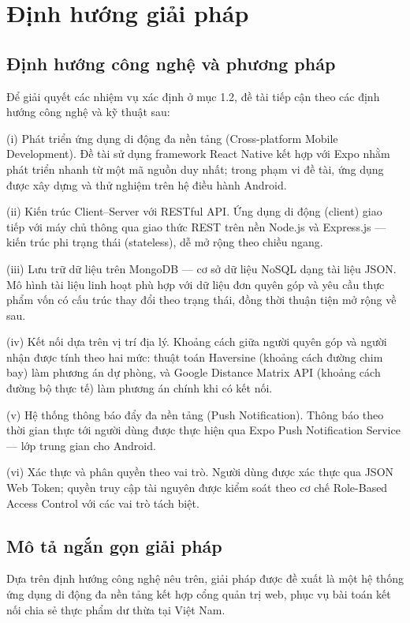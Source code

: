 \documentclass[../main.tex]{subfiles}%
\begin{document}
\section{Định hướng giải pháp}%
\label{section:1.3}

\subsection{Định hướng công nghệ và phương pháp}
\label{subsection:1.3.1}

Để giải quyết các nhiệm vụ xác định ở mục 1.2, đề tài tiếp cận theo các định hướng công nghệ và kỹ thuật sau:

(i) Phát triển ứng dụng di động đa nền tảng (Cross-platform Mobile Development). Đề tài sử dụng framework React Native kết hợp với Expo nhằm phát triển nhanh từ một mã nguồn duy nhất; trong phạm vi đề tài, ứng dụng được xây dựng và thử nghiệm trên hệ điều hành Android.

(ii) Kiến trúc Client–Server với RESTful API. Ứng dụng di động (client) giao tiếp với máy chủ thông qua giao thức REST trên nền Node.js và Express.js — kiến trúc phi trạng thái (stateless), dễ mở rộng theo chiều ngang.

(iii) Lưu trữ dữ liệu trên MongoDB — cơ sở dữ liệu NoSQL dạng tài liệu JSON. Mô hình tài liệu linh hoạt phù hợp với dữ liệu đơn quyên góp và yêu cầu thực phẩm vốn có cấu trúc thay đổi theo trạng thái, đồng thời thuận tiện mở rộng về sau.

(iv) Kết nối dựa trên vị trí địa lý. Khoảng cách giữa người quyên góp và người nhận được tính theo hai mức: thuật toán Haversine (khoảng cách đường chim bay) làm phương án dự phòng, và Google Distance Matrix API (khoảng cách đường bộ thực tế) làm phương án chính khi có kết nối. 

(v) Hệ thống thông báo đẩy đa nền tảng (Push Notification). Thông báo theo thời gian thực tới người dùng được thực hiện qua Expo Push Notification Service — lớp trung gian cho Android. 

(vi) Xác thực và phân quyền theo vai trò. Người dùng được xác thực qua JSON Web Token; quyền truy cập tài nguyên được kiểm soát theo cơ chế Role-Based Access Control với các vai trò tách biệt. 

\subsection{Mô tả ngắn gọn giải pháp}
\label{subsection:1.3.2}

Dựa trên định hướng công nghệ nêu trên, giải pháp được đề xuất là một hệ thống ứng dụng di động đa nền tảng kết hợp cổng quản trị web, phục vụ bài toán kết nối chia sẻ thực phẩm dư thừa tại Việt Nam.
\end{document}
